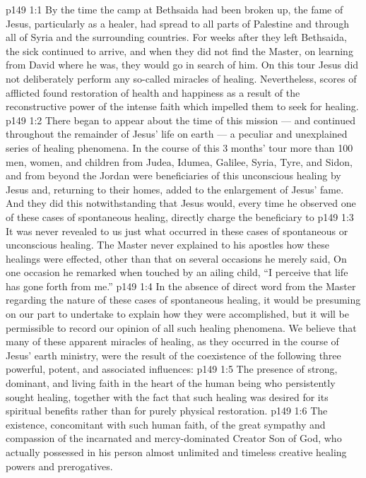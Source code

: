 \vs p149 1:1 By the time the camp at Bethsaida had been broken up, the fame of Jesus, particularly as a healer, had spread to all parts of Palestine and through all of Syria and the surrounding countries. For weeks after they left Bethsaida, the sick continued to arrive, and when they did not find the Master, on learning from David where he was, they would go in search of him. On this tour Jesus did not deliberately perform any so\hyp{}called miracles of healing. Nevertheless, scores of afflicted found restoration of health and happiness as a result of the reconstructive power of the intense faith which impelled them to seek for healing.
\vs p149 1:2 There began to appear about the time of this mission --- and continued throughout the remainder of Jesus’ life on earth --- a peculiar and unexplained series of healing phenomena. In the course of this 3 months’ tour more than 100 men, women, and children from Judea, Idumea, Galilee, Syria, Tyre, and Sidon, and from beyond the Jordan were beneficiaries of this unconscious healing by Jesus and, returning to their homes, added to the enlargement of Jesus’ fame. And they did this notwithstanding that Jesus would, every time he observed one of these cases of spontaneous healing, directly charge the beneficiary to 
\vs p149 1:3 \pc It was never revealed to us just what occurred in these cases of spontaneous or unconscious healing. The Master never explained to his apostles how these healings were effected, other than that on several occasions he merely said,  On one occasion he remarked when touched by an ailing child, “I perceive that life has gone forth from me.”
\vs p149 1:4 In the absence of direct word from the Master regarding the nature of these cases of spontaneous healing, it would be presuming on our part to undertake to explain how they were accomplished, but it will be permissible to record our opinion of all such healing phenomena. We believe that many of these apparent miracles of healing, as they occurred in the course of Jesus’ earth ministry, were the result of the coexistence of the following three powerful, potent, and associated influences:
\vs p149 1:5 \bibnobreakspace The presence of strong, dominant, and living faith in the heart of the human being who persistently sought healing, together with the fact that such healing was desired for its spiritual benefits rather than for purely physical restoration.
\vs p149 1:6 \bibnobreakspace The existence, concomitant with such human faith, of the great sympathy and compassion of the incarnated and mercy\hyp{}dominated Creator Son of God, who actually possessed in his person almost unlimited and timeless creative healing powers and prerogatives.
